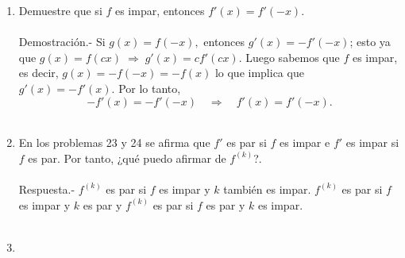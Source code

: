 \begin{enumerate}[\bfseries 1]
    \item Demuestre que si $f$ es impar, entonces $f'(x)=f'(-x)$. \\\\
	Demostración.-\; Si $g(x)=f(-x),$ entonces $g'(x)=-f'(-x)$; esto ya que $g(x)=f(cx)\; \Rightarrow \; g'(x)=cf'(cx)$. Luego sabemos que $f$ es impar, es decir, $g(x)=-f(-x)=-f(x)$ lo que implica que $g'(x)=-f'(x)$. Por lo tanto, 
	$$-f'(x)=-f'(-x) \quad \Rightarrow \quad f'(x)=f'(-x).$$\\

    \item En los problemas 23 y 24 se afirma que $f'$ es par si $f$ es impar e $f'$ es impar si $f$ es par. Por tanto, ¿qué puedo afirmar de $f^{(k)}$?.\\\\
	Respuesta.- $f^{(k)}$ es par si $f$ es impar y $k$ también es impar. $f^{(k)}$ es par si $f$ es impar y $k$ es par y $f^{(k)}$ es par si $f$ es par y $k$ es impar.\\\\

    \item 

\end{enumerate}
